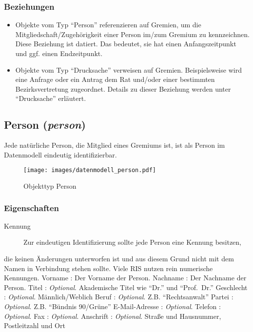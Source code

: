 \documentclass[,a4paper]{article}
\makeatletter
\def\maxwidth{\ifdim\Gin@nat@width>\linewidth\linewidth
\else\Gin@nat@width\fi}
\let\Oldincludegraphics\includegraphics
\renewcommand{\includegraphics}[1]{\Oldincludegraphics[width=\maxwidth]{#1}}
\makeatother
\begin{document}
\subsubsection{Beziehungen}

\begin{itemize}
\item
  Objekte vom Typ ``Person'' referenzieren auf Gremien, um die
  Mitgliedschaft/Zugehörigkeit einer Person im/zum Gremium zu
  kennzeichnen. Diese Beziehung ist datiert. Das bedeutet, sie hat einen
  Anfangszeitpunkt und ggf. einen Endzeitpunkt.
\item
  Objekte vom Typ ``Drucksache'' verweisen auf Gremien. Beispielsweise
  wird eine Anfrage oder ein Antrag dem Rat und/oder einer bestimmten
  Bezirksvertretung zugeordnet. Details zu dieser Beziehung werden unter
  ``Drucksache'' erläutert.
\end{itemize}

\subsection{Person (\emph{person})}

Jede natürliche Person, die Mitglied eines Gremiums ist, ist als Person
im Datenmodell eindeutig identifizierbar.

\begin{figure}[htbp]
\centering
\texttt{[image: images/datenmodell\_person.pdf]}
\caption{Objekttyp Person}
\end{figure}

\subsubsection{Eigenschaften}

\begin{description}
\item[Kennung]
Zur eindeutigen Identifizierung sollte jede Person eine Kennung
besitzen,
\end{description}

die keinen Änderungen unterworfen ist und aus diesem Grund nicht mit dem
Namen in Verbindung stehen sollte. Viele RIS nutzen rein numerische
Kennungen. Vorname : Der Vorname der Person. Nachname : Der Nachname der
Person. Titel : \emph{Optional}. Akademische Titel wie ``Dr.'' und
``Prof.~Dr.'' Geschlecht : \emph{Optional}. Männlich/Weblich Beruf :
\emph{Optional}. Z.B. ``Rechtsanwalt'' Partei : \emph{Optional}. Z.B.
``Bündnis 90/Grüne'' E-Mail-Adresse : \emph{Optional}. Telefon :
\emph{Optional}. Fax : \emph{Optional}. Anschrift : \emph{Optional}.
Straße und Hausnummer, Postleitzahl und Ort
\end{document}
